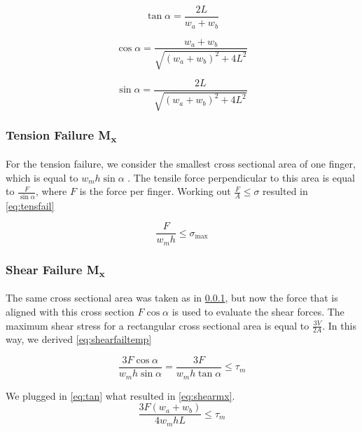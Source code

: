 \begin{equation}
	\label{eq:tan}
	\tan \alpha = \frac{2L}{w_a + w_b}
\end{equation}

\begin{equation}
	\label{eq:cos}
	\cos \alpha = \frac{w_a + w_b}{\sqrt{ \left( w_a + w_b \right) ^2 + 4L ^2 }}
\end{equation}

\begin{equation}
	\label{eq:sin}
	\sin \alpha = \frac{2L}{\sqrt{ \left( w_a + w_b \right) ^2 + 4L ^2 }}
\end{equation}


\subsubsection{Tension Failure M\textsubscript{x}}\label{ssec:tensfail}
For the tension failure, we consider the smallest cross sectional area of one finger, which is equal to $w_m h \sin \alpha$ . 
The tensile force perpendicular to this area is equal to $\frac{F}{\sin \alpha}$, where $F$ is the force per finger. 
Working out $\frac{F}{A} \le \sigma$ resulted in \cref{eq:tensfail}


\begin{equation}
	\label{eq:tensfail}
	\frac{F}{w_m  h} \le \sigma_\text{max}
\end{equation}


\subsubsection{Shear Failure M\textsubscript{x}}
The same cross sectional area was taken as in \cref{ssec:tensfail}, but now the force that is aligned with this cross section $F \cos \alpha$ is used to evaluate the shear forces. 
The maximum shear stress for a rectangular cross sectional area is equal to $\frac{3V}{2A}$. 
In this way, we derived \cref{eq:shearfailtemp}

\begin{equation}
	\label{eq:shearfailtemp}
	\frac{3F \cos \alpha}{w_m h \sin \alpha} = \frac{3F }{w_m h \tan \alpha} \le \tau_m
\end{equation}

We plugged in \cref{eq:tan} what resulted in \cref{eq:shearmx}.
\begin{equation}
	\label{eq:shearmx}
	\frac{ 3 F \left(w_a + w_b \right) }{ 4  w_m h L} \le \tau_m	
\end{equation}

